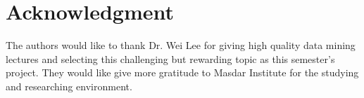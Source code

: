 \documentclass[journal]{IEEEtran}
\begin{document}
\appendices



\section*{Acknowledgment}


The authors would like to thank Dr. Wei Lee for giving high quality data mining lectures and selecting this challenging but rewarding topic as this semester's project. They would like give more gratitude to Masdar Institute for the studying and researching environment.


\ifCLASSOPTIONcaptionsoff
  \newpage
\fi






%

%

\end{document}
